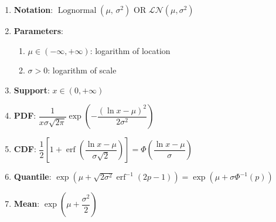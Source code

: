 \begin{enumerate}
    \item \textbf{Notation}:
    ${\displaystyle \operatorname {Lognormal} \left(\mu ,\,\sigma ^{2}\right)}$
    OR
    $\mathcal{L N} (\mu, \sigma^2)$
    \hfill \cite{wiki/Log-normal_distribution, statistics/book/Statistics-for-Data-Scientists/Maurits-Kaptein}

    \item \textbf{Parameters}:
    \begin{enumerate}
        \item ${\displaystyle \mu \in (-\infty ,+\infty )}$: logarithm of location
        \hfill \cite{wiki/Log-normal_distribution, statistics/book/Statistics-for-Data-Scientists/Maurits-Kaptein}

        \item ${\displaystyle \sigma >0}$: logarithm of scale
        \hfill \cite{wiki/Log-normal_distribution, statistics/book/Statistics-for-Data-Scientists/Maurits-Kaptein}
    \end{enumerate}

    \item \textbf{Support}: ${\displaystyle x\in (0,+\infty )}$
    \hfill \cite{wiki/Log-normal_distribution, statistics/book/Statistics-for-Data-Scientists/Maurits-Kaptein}

    \item \textbf{PDF}:
    ${\displaystyle {\dfrac {1}{x\sigma {\sqrt {2\pi }}}}\exp \left(-{\dfrac {\left(\ln x-\mu \right)^{2}}{2\sigma ^{2}}}\right)}$
    \hfill \cite{wiki/Log-normal_distribution, statistics/book/Statistics-for-Data-Scientists/Maurits-Kaptein}

    \item \textbf{CDF}:
    $
        {\displaystyle {{\dfrac {1}{2}}\left[1+\operatorname {erf} \left({\dfrac {\ln x-\mu }{\sigma {\sqrt {2}}}}\right)\right]
        =\Phi {\left({\dfrac {\ln x-\mu }{\sigma }}\right)}}}
    $
    \hfill \cite{wiki/Log-normal_distribution}

    \item \textbf{Quantile}:
    $
        {\displaystyle {\exp \left(\mu +{\sqrt {2\sigma ^{2}}}\operatorname {erf} ^{-1}(2p-1)\right)
        =\exp(\mu +\sigma \Phi ^{-1}(p))}}
    $
    \hfill \cite{wiki/Log-normal_distribution}

    \item \textbf{Mean}: ${\displaystyle \exp \left(\mu +{\dfrac {\sigma ^{2}}{2}}\right)}$
    \hfill \cite{wiki/Log-normal_distribution}


\end{enumerate}
